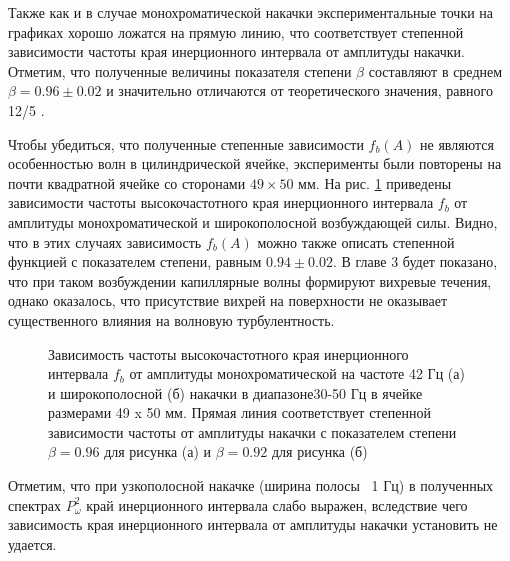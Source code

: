 Также как и в случае монохроматической накачки экспериментальные точки на графиках хорошо ложатся на прямую линию, что соответствует степенной зависимости частоты края инерционного интервала от амплитуды накачки. Отметим, что полученные величины показателя степени $\beta$ составляют в среднем $\beta = 0.96 \pm 0.02$ и значительно отличаются от теоретического значения, равного 12/5 \cite{Ryzhenkova1990}.

Чтобы убедиться, что полученные степенные зависимости $f_b(A)$ не являются особенностью волн в цилиндрической 
ячейке, эксперименты были повторены на почти квадратной ячейке со сторонами $49 \times 50$ мм. На рис. \ref{img:water_fb_rect} приведены зависимости частоты высокочастотного края инерционного интервала $f_b$ от амплитуды монохроматической и широкополосной возбуждающей силы. Видно, что в этих случаях зависимость $f_b(A)$ можно также описать степенной функцией с показателем степени, равным $0.94 \pm 0.02$. В главе 3 будет показано, что при таком возбуждении капиллярные волны формируют вихревые течения, однако оказалось, что присутствие вихрей на поверхности не оказывает существенного влияния на волновую турбулентность.
\begin{figure}[ht]
 \begin{minipage}[ht]{0.49\linewidth}
 \end{minipage}
 \hfill
 \begin{minipage}[ht]{0.49\linewidth}
 \end{minipage}
 \caption{Зависимость частоты высокочастотного края инерционного интервала $f_b$ от амплитуды монохроматической на частоте 42 Гц (а) и широкополосной (б) накачки в диапазоне30-50 Гц в ячейке размерами 49 x 50 мм.  Прямая линия соответствует степенной зависимости частоты от амплитуды накачки с показателем степени $\beta = 0.96$ для рисунка (а) и $\beta = 0.92$ для рисунка (б)}
 \label{img:water_fb_rect} 
\end{figure}

Отметим, что при узкополосной накачке (ширина полосы ~1 Гц) в полученных спектрах $P^2_\omega$ край инерционного интервала слабо выражен, вследствие чего зависимость края инерционного интервала от амплитуды накачки установить не удается.

